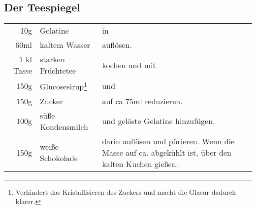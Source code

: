 \subsection*{Der Teespiegel}
\begin{longtable}{rlL{15.4cm}}
	10g			&	Gelatine			& in  \\
	60ml		&	kaltem Wasser		&  auflösen. \\
	1 kl Tasse	&	starken Früchtetee	& kochen und mit \\
	150g		&	Glucosesirup\footnote{Verhindert das Kristallisieren des Zuckers und macht die Glasur dadurch klarer.} & und \\
	150g		&	Zucker				& auf ca 75ml reduzieren. \\
	100g		&	süße Kondensmilch	& und gelöste Gelatine hinzufügen. \\
	150g		&	weiße Schokolade	& darin auflösen und pürieren.  Wenn die Masse auf ca.  abgekühlt ist,  über den kalten Kuchen gießen.\\
\end{longtable}
